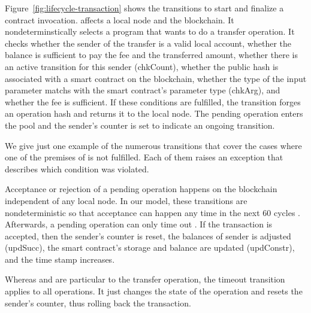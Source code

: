 \documentclass[runningheads]{llncs}
\begin{document}
Figure~\ref{fig:lifecycle-transaction} shows the transitions to start
and finalize a contract invocation.
 affects a local node and the blockchain. It
nondeterminstically selects a program that wants to do a transfer
operation. It
checks whether the sender of the transfer is a valid local account, whether
the balance is sufficient to pay the fee and the transferred amount,
whether there is an active transition for this sender (chkCount),
whether the public hash is associated with a smart contract on the blockchain, whether the type of the input parameter matchs with the smart contract's parameter type (chkArg), and whether the fee is
sufficient. If these conditions are fulfilled, the transition forges
an operation hash and returns it to the local node. 
The pending operation enters the pool and the sender's counter is set
to indicate an ongoing transition.

We give just one example  of the numerous
transitions that cover the cases where one of the 
premises of  is not fulfilled. Each of them
raises an exception that describes which condition was violated.

Acceptance or rejection of a pending operation happens on the
blockchain independent of any local node. In our model, these
transitions are nondeterministic so that acceptance can happen any
time in the next 60 cycles . Afterwards, a
pending operation can only time out .
If the transaction is accepted, then the sender's counter is reset,
the balances of sender is adjusted (updSucc), the smart contract's storage and balance are updated (updConstr), and the time stamp increases.

Whereas  and  are
particular to the transfer operation, the timeout transition applies
to all operations. It just changes the state of the operation and
resets the sender's counter, thus rolling back the transaction.

\end{document}
